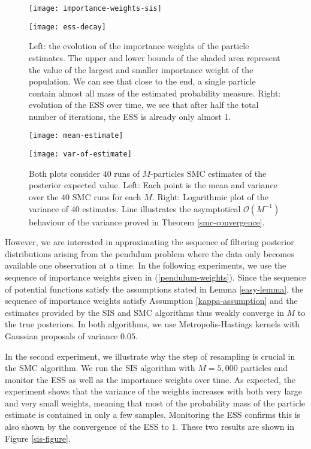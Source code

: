 \begin{figure}[htbp]
  \begin{minipage}{.5\textwidth}
    \texttt{[image: importance-weights-sis]}
  \end{minipage}
  \begin{minipage}{.5\textwidth}
    \texttt{[image: ess-decay]}
  \end{minipage}
  \caption{Left: the evolution of the importance weights of the particle estimates. The upper and lower bounds of the shaded area represent the value of the largest and smaller importance weight of the population. We can see that close to the end, a single particle contain almost all mass of the estimated probability measure. Right: evolution of the ESS over time, we see that after half the total number of iterations, the ESS is already only almost 1.}\label{sis-figure}

  \bigskip
  
  \begin{minipage}{.5\textwidth}
    \texttt{[image: mean-estimate]}
  \end{minipage}
  \begin{minipage}{.5\textwidth}
    \texttt{[image: var-of-estimate]}
  \end{minipage}
  \caption{Both plots consider $40$ runs of $M$-particles SMC estimates of the posterior expected value. Left: Each point is the mean and variance over the $40$ SMC runs for each $M$. Right: Logarithmic plot of the variance of $40$ estimates. Line illustrates the asymptotical $\mathcal{O}(M^{-1})$ behaviour of the variance proved in Theorem \ref{smc-convergence}. }\label{smc-figure}
\end{figure}


However, we are interested in approximating the sequence of filtering posterior distributions arising from the pendulum problem where the data only becomes available one observation at a time. In the following experiments, we use the sequence of importance weights given in (\ref{pendulum-weights}). Since the sequence of potential functions satisfy the assumptions stated in Lemma \ref{easy-lemma}, the sequence of importance weights  satisfy Assumption \ref{kappa-assumption} and the estimates provided by the SIS and SMC algorithms thus weakly converge in $M$ to the true posteriors. In both algorithms, we use Metropolis-Hastings kernels with Gaussian proposals of variance $0.05$. 

In the second experiment, we illustrate why the step of resampling is crucial in the SMC algorithm. We run the SIS algorithm with $M=5,000$ particles and monitor the ESS as well as the importance weights over time. As expected, the experiment shows that the variance of the weights increases with both very large and very small weights, meaning that most of the probability mass of the particle estimate is contained in only a few samples. Monitoring the ESS confirms this is also shown by the convergence of the ESS to $1$. These two results are shown in Figure \ref{sis-figure}.

